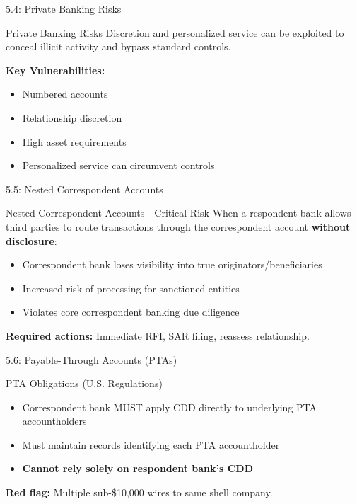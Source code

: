 \documentclass{beamer}
\begin{document}
	\begin{frame}{5.4: Private Banking Risks}
		\begin{block}{Private Banking Risks}
			Discretion and personalized service can be exploited to conceal illicit activity and bypass standard controls.
		\end{block}
		\textbf{Key Vulnerabilities:}
		\begin{itemize}
			\item Numbered accounts
			\item Relationship discretion
			\item High asset requirements
			\item Personalized service can circumvent controls
		\end{itemize}
	\end{frame}
	
	\begin{frame}{5.5: Nested Correspondent Accounts}
		\begin{block}{Nested Correspondent Accounts - Critical Risk}
			When a respondent bank allows third parties to route transactions through the correspondent account \textbf{without disclosure}:
			\begin{itemize}
				\item Correspondent bank loses visibility into true originators/beneficiaries
				\item Increased risk of processing for sanctioned entities
				\item Violates core correspondent banking due diligence
			\end{itemize}
		\end{block}
		\textbf{Required actions:} Immediate RFI, SAR filing, reassess relationship.
	\end{frame}
	
	\begin{frame}{5.6: Payable-Through Accounts (PTAs)}
		\begin{block}{PTA Obligations (U.S. Regulations)}
			\begin{itemize}
				\item Correspondent bank MUST apply CDD directly to underlying PTA accountholders
				\item Must maintain records identifying each PTA accountholder
				\item \textbf{Cannot rely solely on respondent bank's CDD}
			\end{itemize}
		\end{block}
		\textbf{Red flag:} Multiple sub-\$10,000 wires to same shell company.
	\end{frame}
	
\end{document}
